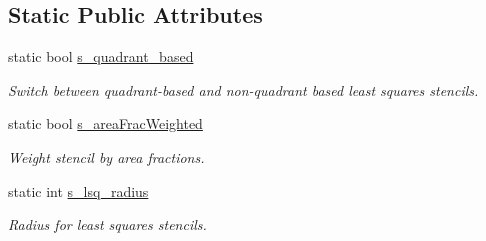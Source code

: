 \subsection*{Static Public Attributes}
\begin{DoxyCompactItemize}
\item 
static bool \hyperlink{classmfdirichletconductivityebbc_a2634626499b25aa7af9b78a7a4f1ceba}{s\+\_\+quadrant\+\_\+based}
\begin{DoxyCompactList}\small\item\em Switch between quadrant-\/based and non-\/quadrant based least squares stencils. \end{DoxyCompactList}\item 
static bool \hyperlink{classmfdirichletconductivityebbc_a3304da845510beff0a8a6312c1806eb6}{s\+\_\+area\+Frac\+Weighted}
\begin{DoxyCompactList}\small\item\em Weight stencil by area fractions. \end{DoxyCompactList}\item 
static int \hyperlink{classmfdirichletconductivityebbc_acb9e36ee825b3c22ccce9aac9538638b}{s\+\_\+lsq\+\_\+radius}
\begin{DoxyCompactList}\small\item\em Radius for least squares stencils. \end{DoxyCompactList}\end{DoxyCompactItemize}
